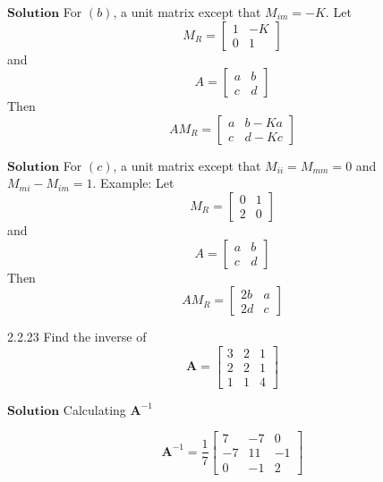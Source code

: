 $\boxed{\textbf{Solution}}$  For $(b)$, a unit matrix except that $M_{i m}=-K$.
Let 
$$M_{R}=\left[\begin{array}{cc}1 & -K \\ 0 & 1\end{array}\right]$$ 
and 
$$A=\left[\begin{array}{ll}a & b \\ c & d\end{array}\right]$$
Then 
$$A M_{R}=\left[\begin{array}{ll}a & b-K a \\ c & d-K c\end{array}\right]$$


$\boxed{\textbf{Solution}}$  For $(c)$, a unit matrix except that $M_{i i}=M_{m m}=0$ and $M_{m i}-M_{i m}=1$.
Example: Let 
$$M_{R}=\left[\begin{array}{ll}0 & 1 \\ 2 & 0\end{array}\right]$$ 
and 
$$A=\left[\begin{array}{ll}a & b \\ c & d\end{array}\right]$$
Then 
$$A M_{R}=\left[\begin{array}{ll}2 b & a \\ 2 d & c\end{array}\right]$$


\newpage



\begin{mybox}{2.2.23}
Find the inverse of
$$
\mathbf{A}=\begin{bmatrix}{3} & {2} & {1} \\ {2} & {2} & {1} \\ {1} & {1} & {4}\end{bmatrix}
$$
\end{mybox}


$\boxed{\textbf{Solution}}$ Calculating $\mathbf{A}^{-1}$


$$\mathbf{A}^{-1}=\frac{1}{7}\begin{bmatrix}{7} & {-7} & {0} \\ {-7} & {11} & {-1} \\ {0} & {-1} & {2}\end{bmatrix}$$

$$$$

